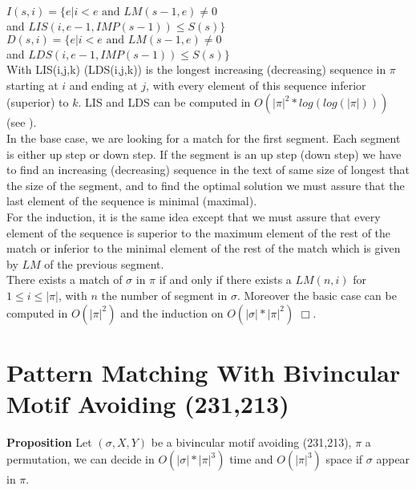 \documentclass[a4paper]{llncs}
\newcommand{\ptext}{\pi}
\newcommand{\pmotif}{\sigma}
\newcommand{\x}{X}
\newcommand{\y}{Y}
\newcommand{\bmotif}{(\sigma,\x,\y)}
\newcounter{num}
\newcommand{\num}{\stepcounter{num} }
\begin{document}
			$I(s,i)=\{e|\text{$i<e$ and $LM(s-1,e)\neq 0$}$ \\
			\indent \indent \indent and  $LIS(i,e-1,IMP(s-1)) \leq S(s) \}$ \\
			
			$D(s,i)=\{e|\text{$i<e$ and $LM(s-1,e)\neq 0$}$ \\
			\indent \indent \indent and  $LDS(i,e-1,IMP(s-1)) \leq S(s) \}$ \\
					                       
			With LIS(i,j,k) (LDS(i,j,k)) is the longest increasing (decreasing) sequence in $\ptext$ starting at $i$ and ending at $j$,
			with every element of this sequence
			inferior (superior) to $k$. 
			LIS and LDS can be computed in $O(|\ptext|^2*log(log(|\ptext|)))$ (see \cite{Bespamyatnikh00enumeratinglongest}).\\
			
			In the base case, 
			we are looking for a match for the first segment.
			Each segment is either up step or down step.
			If the segment is an up step (down step)
			we have to find an increasing (decreasing) sequence
			in the text of same size of longest that 
			the size of the segment,
			and to find the optimal solution 
			we must assure that the last element
			of the sequence is minimal (maximal).\\
			For the induction, it is the same idea
			except that we must assure that 
			every element of the sequence is superior 
			to the maximum element of the rest of the match
			or inferior to the minimal element of the rest of the match
			which is given by $LM$ of
			the previous segment.\\
			
			There exists a match of $\pmotif$ in $\ptext$ if and only if
			there exists a $LM(n,i)$ for $1 \leq i \leq |\ptext|$,
			with $n$ the number of segment in $\pmotif$.
			Moreover the basic case can be computed in $O(|\ptext|^2)$
			and the induction on $O(|\pmotif|*|\ptext|^2)$ $\Box$.
			
					
		\section{Pattern Matching With Bivincular Motif Avoiding (231,213)}	
		
			\textbf{Proposition \num \thenum } Let $\bmotif$ be a bivincular motif 
			avoiding (231,213), 
			$\ptext$ a permutation,
			we can decide in $O(|\pmotif|*|\ptext|^3)$ time
			and $O(|\ptext|^3)$ space
			if $\pmotif$ 
			appear in $\ptext$.\\	
			
\end{document}
